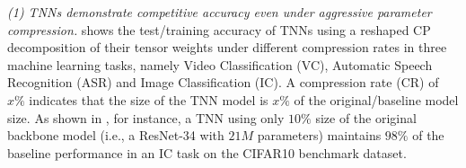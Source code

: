 \emph{(1) TNNs demonstrate competitive accuracy even under aggressive parameter compression.}
 shows the test/training accuracy of TNNs using a reshaped CP decomposition of their tensor weights under different compression rates in three machine learning tasks, namely Video Classification (VC), Automatic Speech Recognition (ASR) and Image Classification (IC). 
A compression rate (CR) of $x\%$ indicates that the size of the TNN model is  $x\%$ of the original/baseline model size.
As shown in , for instance, a TNN using only $10\%$ size of the original backbone model (i.e., a ResNet-34 with $21M$ parameters) maintains $98\%$ of the baseline performance in an IC task on the CIFAR10 benchmark dataset. %







